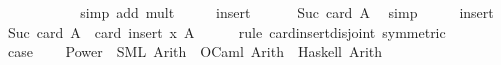 \begin{isabellebody}
\ \isamarkupfalse%
\ {\isachardoublequoteopen}{\isasymdots}\ {\isacharplus}{\kern0pt}\ {\isasymdots}\ {\isacharequal}{\kern0pt}\ {}\ {\isacharasterisk}{\kern0pt}\ {\isasymdots}{\isachardoublequoteclose}\ \isamarkupfalse%
\ {\isacharparenleft}{\kern0pt}simp\ add{\isacharcolon}{\kern0pt}\ mult{\isacharunderscore}{\kern0pt}{}{\isacharparenright}{\kern0pt}\isanewline
\ \ \isamarkupfalse%
\ \isamarkupfalse%
\ insert{\isacharparenleft}{\kern0pt}{}{\isacharparenright}{\kern0pt}\ \isamarkupfalse%
\ {\isachardoublequoteopen}{\isasymdots}\ {\isacharequal}{\kern0pt}\ {}\ {\isacharcircum}{\kern0pt}\ Suc\ {\isacharparenleft}{\kern0pt}card\ A{\isacharparenright}{\kern0pt}{\isachardoublequoteclose}\ \isamarkupfalse%
\ simp\isanewline
\ \ \isamarkupfalse%
\ \isamarkupfalse%
\ insert{\isacharparenleft}{\kern0pt}{}{\isacharcomma}{\kern0pt}{}{\isacharparenright}{\kern0pt}\ \isamarkupfalse%
\ {\isachardoublequoteopen}Suc\ {\isacharparenleft}{\kern0pt}card\ A{\isacharparenright}{\kern0pt}\ {\isacharequal}{\kern0pt}\ card\ {\isacharparenleft}{\kern0pt}insert\ x\ A{\isacharparenright}{\kern0pt}{\isachardoublequoteclose}\isanewline
\ \ \ \ \isamarkupfalse%
\ {\isacharparenleft}{\kern0pt}rule\ card{\isacharunderscore}{\kern0pt}insert{\isacharunderscore}{\kern0pt}disjoint\ {\isacharbrackleft}{\kern0pt}symmetric{\isacharbrackright}{\kern0pt}{\isacharparenright}{\kern0pt}\isanewline
\ \ \isamarkupfalse%
\ \isamarkupfalse%
\ {\isacharquery}{\kern0pt}case\ \isacommand{{\isachardot}{\kern0pt}}\isamarkupfalse%
\isanewline
{}\isamarkupfalse%
%
\endisatagproof
{\isafoldproof}%
%
\isadelimproof
%
\endisadelimproof
%
\isadelimdocument
%
\endisadelimdocument
%
\isatagdocument
%
\isamarkuptrue%
%
\endisatagdocument
{\isafolddocument}%
%
\isadelimdocument
%
\endisadelimdocument
{}\isamarkupfalse%
\isanewline
\ \ \ Power\ {\isasymrightharpoonup}\ {\isacharparenleft}{\kern0pt}SML{\isacharparenright}{\kern0pt}\ Arith\ \ {\isacharparenleft}{\kern0pt}OCaml{\isacharparenright}{\kern0pt}\ Arith\ \ {\isacharparenleft}{\kern0pt}Haskell{\isacharparenright}{\kern0pt}\ Arith\isanewline
%
\isadelimtheory
\isanewline
%
\endisadelimtheory
%
\isatagtheory
{}\isamarkupfalse%
%
\endisatagtheory
{\isafoldtheory}%
%
\isadelimtheory
%
\endisadelimtheory
%
\end{isabellebody}%
